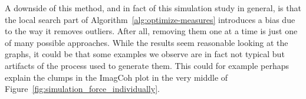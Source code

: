 A downside of this method, and in fact of this simulation study in general, is
that the local search part of Algorithm~\ref{alg:optimize-measures} introduces
a bias due to the way it removes outliers. After all, removing them one at a
time is just one of many possible approaches. While the results seem reasonable
looking at the graphs, it could be that some examples we observe are in fact
not typical but artifacts of the process used to generate them. This could
for example perhaps explain the clumps in the ImagCoh plot
in the very middle of Figure~\ref{fig:simulation_force_individually}.
